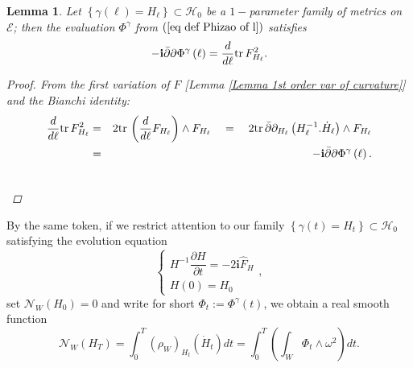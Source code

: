 \documentclass{article}
\newcommand{\func}[1]{\textnormal {#1\,}}
\newtheorem{lemma}[theorem]{Lemma}
\begin{document}
\begin{lemma}       \label{lemma: trF^2 and Phizao}
Let $\left\{ \gamma \left( \ell \right) =H_{\ell }\right\} \subset 
\mathcal{H}_{0}$ be a $1-$parameter family of metrics on $\mathcal{E}$; then the evaluation 
$\Phi ^{\gamma }$ from $\left( \ref{eq def Phizao of l}\right) $ satisfies 
\begin{equation*}
        -\mathbf{i}\bar{\partial}\partial \Phi ^{\gamma }\left( \ell \right)
        =\frac{d}{d\ell }\func{tr}F_{H_{\ell }}^{2}.
\end{equation*}
\begin{proof}
From the first variation of $F$ [\emph{Lemma \ref{Lemma 1st order var of curvature}}] and the Bianchi identity:%
\begin{eqnarray*}
        \frac{d}{d\ell }\func{tr}F_{H_{\ell }}^{2} &=&
        2\func{tr}\left( \frac{d}{d\ell }F_{H_{\ell }}\right)\wedge F_{H_{\ell}}
        \quad=\quad2\func{tr}\bar{\partial}\partial _{H_{\ell }}
        \left( H_{\ell }^{-1}.%
        \dot{H}_{\ell }\right) \wedge F_{H_{\ell }} \\
        &=&-\mathbf{i}\bar{\partial}\partial \Phi ^{\gamma }\left( \ell \right).
\end{eqnarray*}
\vspace{-1.3cm}\[\qedhere\]
\end{proof}
\end{lemma}
By the same token, if we restrict attention to our family $\left\{\gamma(t)=
H_{t}\right\} \subset \mathcal{H}_{0}$ satisfying the evolution equation%
\begin{equation}        \label{eq evolution again}
\left\{ 
\begin{array}{c}
H^{-1}\dfrac{\partial H}{\partial t}=-2\mathbf{i}\hat{F}_{H} \\ 
H\left( 0\right) =H_{0}%
\end{array}%
\right. ,  
\end{equation}%
set $\mathcal{N}_{W}\left( H_{0}\right) =0$ and write for short $\Phi _{t}:=\Phi^{\gamma}(t)$, we obtain a real smooth
function%
\begin{equation}        \label{Eq func N using Phizao}
        \mathcal{N}_{W}\left( H_{T}\right) 
        =\int_{0}^{T}\left( \rho _{W}\right)_{H_{t}}
        \left(\dot{H}_{t}\right) dt
        =\int_{0}^{T}\left( 
        \int_{W}\Phi _{t}\wedge \omega^{2}\right) dt.  
\end{equation}
\end{document}
